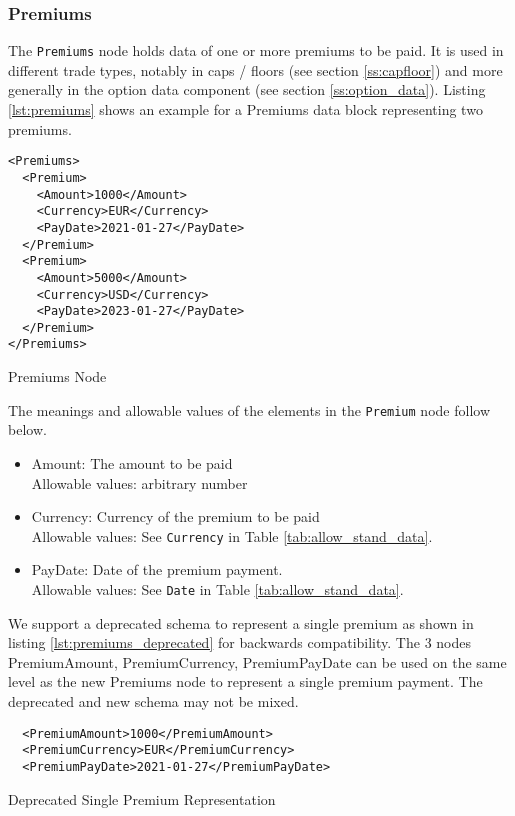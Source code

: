 \subsubsection{Premiums}
\label{ss:premiums}

The \lstinline!Premiums! node holds data of one or more premiums to be paid. It is used in different trade types,
notably in caps / floors (see section \ref{ss:capfloor}) and more generally in the option data component (see section
\ref{ss:option_data}). Listing \ref{lst:premiums} shows an example for a Premiums data block representing two premiums.

\begin{listing}[H]
\begin{verbatim}
<Premiums>
  <Premium>
    <Amount>1000</Amount>
    <Currency>EUR</Currency>
    <PayDate>2021-01-27</PayDate>
  </Premium>
  <Premium>
    <Amount>5000</Amount>
    <Currency>USD</Currency>
    <PayDate>2023-01-27</PayDate>
  </Premium>
</Premiums>
\end{verbatim}
\caption{Premiums Node}
\label{lst:premiums}
\end{listing}

The meanings and allowable values of the elements in the \lstinline!Premium! node follow below.

\begin{itemize}
\item Amount: The amount to be paid\\
  Allowable values: arbitrary number
\item Currency: Currency of the premium to be paid\\
  Allowable values:  See \lstinline!Currency! in Table \ref{tab:allow_stand_data}.
\item PayDate: Date of the premium payment.\\
  Allowable values:  See \lstinline!Date! in Table \ref{tab:allow_stand_data}.
\end{itemize}

We support a deprecated schema to represent a single premium as shown in listing \ref{lst:premiums_deprecated} for
backwards compatibility. The $3$ nodes PremiumAmount, PremiumCurrency, PremiumPayDate can be used on the same level as
the new Premiums node to represent a single premium payment. The deprecated and new schema may not be mixed.

\begin{listing}[H]
\begin{verbatim}
  <PremiumAmount>1000</PremiumAmount>
  <PremiumCurrency>EUR</PremiumCurrency>
  <PremiumPayDate>2021-01-27</PremiumPayDate>
\end{verbatim}
\caption{Deprecated Single Premium Representation}
\label{lst:premiums_deprecated}
\end{listing}
